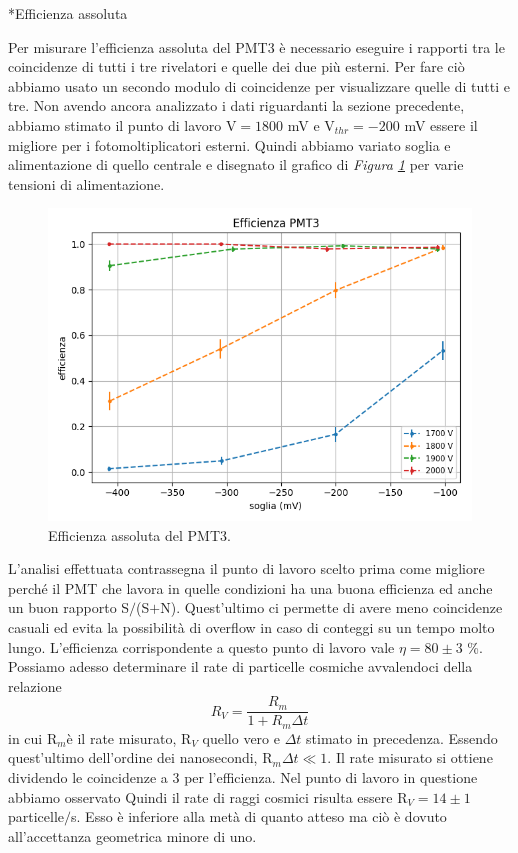 \documentclass[12pt, a4paper]{article}
\begin{document}
\begin{section}*{Efficienza assoluta}

Per misurare l'efficienza assoluta del PMT3 è necessario eseguire i rapporti tra le coincidenze di tutti i tre rivelatori e quelle dei due più esterni. Per fare ciò abbiamo usato un secondo modulo di coincidenze per visualizzare quelle di tutti e tre. Non avendo ancora analizzato i dati riguardanti la sezione precedente, abbiamo stimato il punto di lavoro V$=1800$\! mV e V$_{thr}=-200$\! mV essere il migliore per i fotomoltiplicatori esterni. Quindi abbiamo variato soglia e alimentazione di quello centrale e disegnato il grafico di \emph{Figura \ref{eff}} per varie tensioni di alimentazione.

\begin{figure}[h]
\centering
\includegraphics[width=8 cm]{efficienza}
\caption{Efficienza assoluta del PMT3.}
\label{eff}
\end{figure}

L'analisi effettuata contrassegna il punto di lavoro scelto prima come migliore perché il PMT che lavora in quelle condizioni ha una buona efficienza ed anche un buon rapporto S$/$(S$+$N). Quest'ultimo ci permette di avere meno coincidenze casuali ed evita la possibilità di overflow in caso di conteggi su un tempo molto lungo. L'efficienza corrispondente a questo punto di lavoro vale $\eta=80\pm3$\! \%. Possiamo adesso determinare il rate di particelle cosmiche avvalendoci della relazione 
$$ R_V=\frac{R_m}{1+R_m\Delta t} $$
in cui R$_m$è il rate misurato, R$_V$ quello vero e $\Delta t$ stimato in precedenza. Essendo quest'ultimo dell'ordine dei nanosecondi, R$_m\Delta t \ll 1$. Il rate misurato si ottiene dividendo le coincidenze a 3 per l'efficienza. Nel punto di lavoro in questione abbiamo osservato Quindi il rate di raggi cosmici risulta essere R$_V=14\pm1$\! particelle$/$s. Esso è inferiore alla metà di quanto atteso ma ciò è dovuto all'accettanza geometrica minore di uno.

\end{section}
\end{document}
